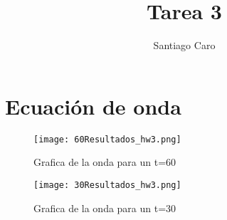 \documentclass[letterpaper,12pt]{article}
\begin{document}
\title{Tarea 3}
\author{Santiago Caro}
\maketitle

\section{Ecuación de onda}

\begin{figure*}
 \centering
   \texttt{[image: 60Resultados\_hw3.png]}
  \caption{Grafica de la onda para un t=60}
  \label{fig:ejemplo}
\end{figure*}

\begin{figure*}
 \centering
   \texttt{[image: 30Resultados\_hw3.png]}
  \caption{Grafica de la onda para un t=30}
  \label{fig:ejemplo}
\end{figure*}
\end{document}
